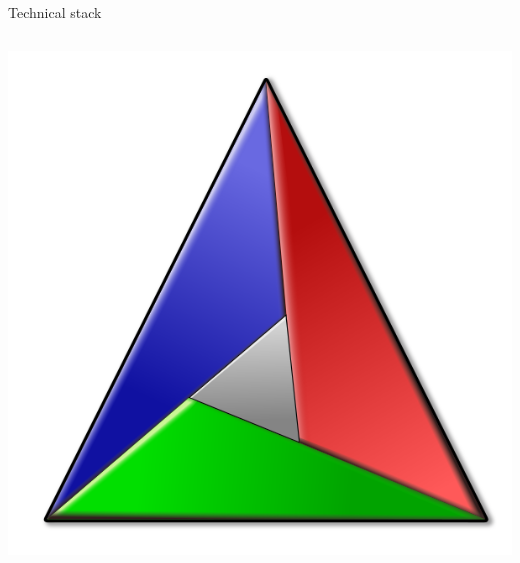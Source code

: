 \begin{frame}{Technical stack}
\begin{columns}
\begin{column}{0.5\textwidth}
\begin{center}
            
            \includegraphics[scale=0.1]{./images/cmake-logo.png}
        \end{center}
    \end{column}
\end{columns}
\end{frame}

